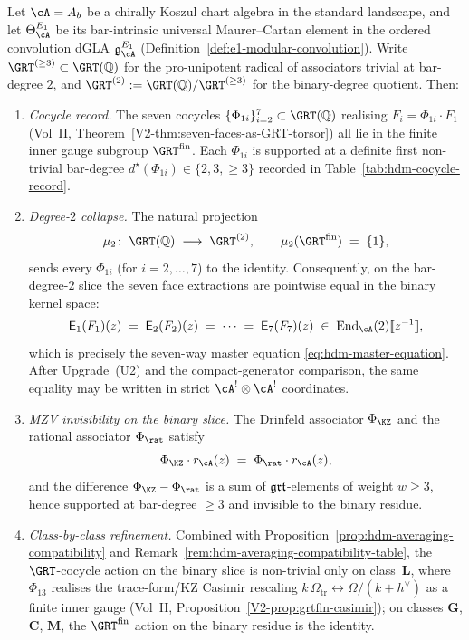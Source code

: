 \begin{theorem}
Let $\cA = A_b$ be a chirally Koszul chart algebra in the standard
landscape, and let $\Theta_\cA^{E_1}$ be its bar-intrinsic universal
Maurer--Cartan element in the ordered convolution dGLA
$\mathfrak{g}_\cA^{E_1}$ \textup{(}Definition~\textup{\ref{def:e1-modular-convolution}}\textup{)}.
Write $\GRT^{(\geq 3)}\subset\GRT(\mathbb{Q})$ for the pro-unipotent
radical of associators trivial at bar-degree $2$, and
$\GRT^{(2)}:=\GRT(\mathbb{Q})/\GRT^{(\geq 3)}$ for the binary-degree
quotient. Then:
\begin{enumerate}[label=\textup{(\roman*)}]
\item \emph{Cocycle record.} The seven cocycles
$\{\Phi_{1i}\}_{i=2}^{7}\subset\GRT(\mathbb{Q})$ realising
$F_i = \Phi_{1i}\cdot F_1$ \textup{(}Vol~II,
Theorem~\textup{\ref{V2-thm:seven-faces-as-GRT-torsor}}\textup{)}
all lie in the finite inner gauge subgroup $\GRT^{\mathrm{fin}}$.
Each $\Phi_{1i}$ is supported at a definite first non-trivial
bar-degree $d^\star(\Phi_{1i})\in\{2,3,\geq 3\}$ recorded in
Table~\textup{\ref{tab:hdm-cocycle-record}}.
\item \emph{Degree-$2$ collapse.} The natural projection
\[
 \mu_2\colon\;\GRT(\mathbb{Q})\;\longrightarrow\;\GRT^{(2)},
 \qquad
 \mu_2(\GRT^{\mathrm{fin}})\;=\;\{1\},
\]
sends every $\Phi_{1i}$ \textup{(}for $i=2,\dots,7$\textup{)} to the
identity. Consequently, on the bar-degree-$2$ slice the seven face
extractions are pointwise equal in the binary kernel space:
\[
 \mathsf E_1(F_1)(z) \;=\;
 \mathsf E_2(F_2)(z) \;=\;\cdots\;=\;
 \mathsf E_7(F_7)(z)
 \;\in\;
 \mathrm{End}_\cA(2)[\![z^{-1}]\!],
\]
which is precisely the seven-way master equation
\eqref{eq:hdm-master-equation}. After Upgrade~\textup{(U2)} and the
compact-generator comparison, the same equality may be written in
strict $\cA^!\otimes\cA^!$ coordinates.
\item \emph{MZV invisibility on the binary slice.} The Drinfeld
associator $\Phi_{\KZ}$ and the rational associator $\Phi_{\rat}$
satisfy
\[
 \Phi_{\KZ}\cdot r_\cA(z)
 \;=\;
 \Phi_{\rat}\cdot r_\cA(z),
\]
and the difference $\Phi_{\KZ}-\Phi_{\rat}$ is a sum of
$\mathfrak{grt}$-elements of weight $w\geq 3$, hence supported at bar-degree
$\geq 3$ and invisible to the binary residue.
\item \emph{Class-by-class refinement.} Combined with
Proposition~\textup{\ref{prop:hdm-averaging-compatibility}} and
Remark~\textup{\ref{rem:hdm-averaging-compatibility-table}}, the
$\GRT$-cocycle action on the binary slice is non-trivial only on
class~$\mathbf{L}$, where $\Phi_{13}$ realises the
trace-form/KZ Casimir rescaling
$k\,\Omega_{\mathrm{tr}}\leftrightarrow\Omega/(k+h^\vee)$ as a
finite inner gauge \textup{(}Vol~II,
Proposition~\textup{\ref{V2-prop:grtfin-casimir}}\textup{)}; on classes
$\mathbf{G}$, $\mathbf{C}$, $\mathbf{M}$, the $\GRT^{\mathrm{fin}}$
action on the binary residue is the identity.
\end{enumerate}
\end{theorem}

